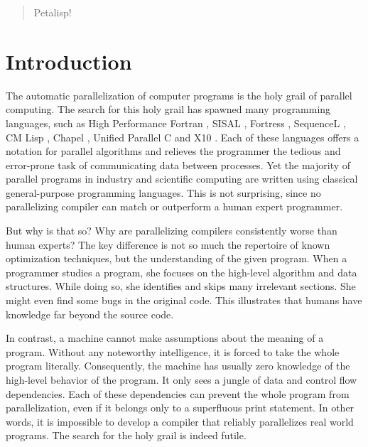\documentclass[siggraph, review=false]{acmart}
\author{Marco Heisig}
\affiliation{%
  \institution{FAU Erlangen-N\"urnberg}
  \streetaddress{Cauerstra\ss e 11}
  \city{Erlangen}
  \postcode{91058}
  \country{Germany}
}
\begin{document}
\begin{abstract}
  Petalisp!
\end{abstract}

\maketitle

\section{Introduction}

The automatic parallelization of computer programs is the holy grail of
parallel computing. The search for this holy grail has spawned many
programming languages, such as High Performance Fortran \cite{HPF}, SISAL
\cite{SISAL}, Fortress \cite{Fortress}, SequenceL \cite{SequenceL}, CM Lisp
\cite{CM-Lisp}, Chapel \cite{Chapel}, Unified Parallel C \cite{UPC} and X10
\cite{X10}. Each of these languages offers a notation for parallel
algorithms and relieves the programmer the tedious and error-prone task of
communicating data between processes. Yet the majority of parallel programs
in industry and scientific computing are written using classical
general-purpose programming languages. This is not surprising, since no
parallelizing compiler can match or outperform a human expert programmer.

But why is that so? Why are parallelizing compilers consistently worse than
human experts? The key difference is not so much the repertoire of known
optimization techniques, but the understanding of the given program. When a
programmer studies a program, she focuses on the high-level algorithm and
data structures. While doing so, she identifies and skips many irrelevant
sections. She might even find some bugs in the original code. This
illustrates that humans have knowledge far beyond the source code.

In contrast, a machine cannot make assumptions about the meaning of a
program. Without any noteworthy intelligence, it is forced to take the
whole program literally. Consequently, the machine has usually zero
knowledge of the high-level behavior of the program. It only sees a jungle
of data and control flow dependencies. Each of these dependencies can
prevent the whole program from parallelization, even if it belongs only to
a superfluous print statement. In other words, it is impossible to develop
a compiler that reliably parallelizes real world programs. The search for
the holy grail is indeed futile.
\end{document}
